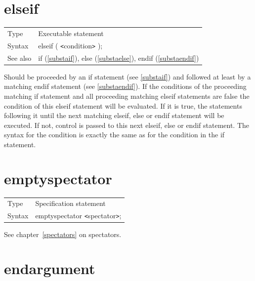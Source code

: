  
\section{elseif}
\label{substaelseif}

\noindent \begin{tabular}{ll}
Type & Executable statement\\
Syntax & elseif ( {\tt<}condition{\tt>} );
\\ See also & if (\ref{substaif}),
              else (\ref{substaelse}),
              endif (\ref{substaendif})
\end{tabular} \vspace{4mm}

\noindent Should be proceeded by an if 
statement (see \ref{substaif}) and followed at least by a matching 
endif 
statement (see \ref{substaendif}). If the conditions of the proceeding 
matching if statement and all proceeding matching
elseif statements are false the 
condition of this elseif statement will be evaluated. If it is true, the 
statements following it until the next matching elseif,
else or endif statement will be executed. 
If not, control is passed to this next elseif, else or endif statement. The 
syntax for the condition is exactly the same as for the condition in the if 
statement. \vspace{10mm}
 

\section{emptyspectator}
\label{substaemptyspectator}

\noindent \begin{tabular}{ll}
Type & Specification statement\\
Syntax & emptyspectator {\tt<}spectator{\tt>};
\end{tabular} \vspace{4mm}

\noindent See chapter~\ref{spectators} on spectators.
\vspace{10mm}


\section{endargument}
\label{substaendargument}

